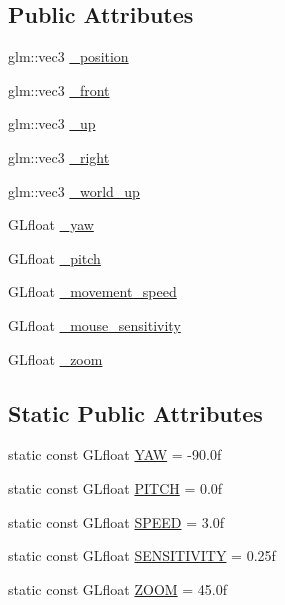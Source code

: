 \subsection*{Public Attributes}
\begin{DoxyCompactItemize}
\item 
glm\+::vec3 \hyperlink{classCamera_a0a931ed2051befaad1f482b3b5e98ca0}{\+\_\+position}
\item 
glm\+::vec3 \hyperlink{classCamera_ac610e748840c4b70c9081c2d68df2e8d}{\+\_\+front}
\item 
glm\+::vec3 \hyperlink{classCamera_a323a698e4c5773ee3ec380851b145e2d}{\+\_\+up}
\item 
glm\+::vec3 \hyperlink{classCamera_a4c556280ed181d8589c28eec7ebebb49}{\+\_\+right}
\item 
glm\+::vec3 \hyperlink{classCamera_aa5d721a01ba1cb41eafb02e39ea29e03}{\+\_\+world\+\_\+up}
\item 
G\+Lfloat \hyperlink{classCamera_ab815461cc043db1f5810c2f488641740}{\+\_\+yaw}
\item 
G\+Lfloat \hyperlink{classCamera_a23a8b8859c44721d7082b89809318918}{\+\_\+pitch}
\item 
G\+Lfloat \hyperlink{classCamera_a6f31b5658310866d3228614a755b59b0}{\+\_\+movement\+\_\+speed}
\item 
G\+Lfloat \hyperlink{classCamera_aeb483d642e0bcf11aa881467ac9676fe}{\+\_\+mouse\+\_\+sensitivity}
\item 
G\+Lfloat \hyperlink{classCamera_a99dc4d95f58be2427ff6c8d93c676ecd}{\+\_\+zoom}
\end{DoxyCompactItemize}
\subsection*{Static Public Attributes}
\begin{DoxyCompactItemize}
\item 
static const G\+Lfloat \hyperlink{classCamera_a79050e94e98c5c1cc0127c41edb4ed16}{Y\+AW} = -\/90.\+0f
\item 
static const G\+Lfloat \hyperlink{classCamera_afd43f32a47d2db8922dc32030fd84379}{P\+I\+T\+CH} = 0.\+0f
\item 
static const G\+Lfloat \hyperlink{classCamera_acc2ddbb4a3bdb2829896703edf72ca1e}{S\+P\+E\+ED} = 3.\+0f
\item 
static const G\+Lfloat \hyperlink{classCamera_adee09ae2133f9fe95a6eb72a6cb8db20}{S\+E\+N\+S\+I\+T\+I\+V\+I\+TY} = 0.\+25f
\item 
static const G\+Lfloat \hyperlink{classCamera_a34cdfe4c17868880037d5ff78159f158}{Z\+O\+OM} = 45.\+0f
\end{DoxyCompactItemize}
